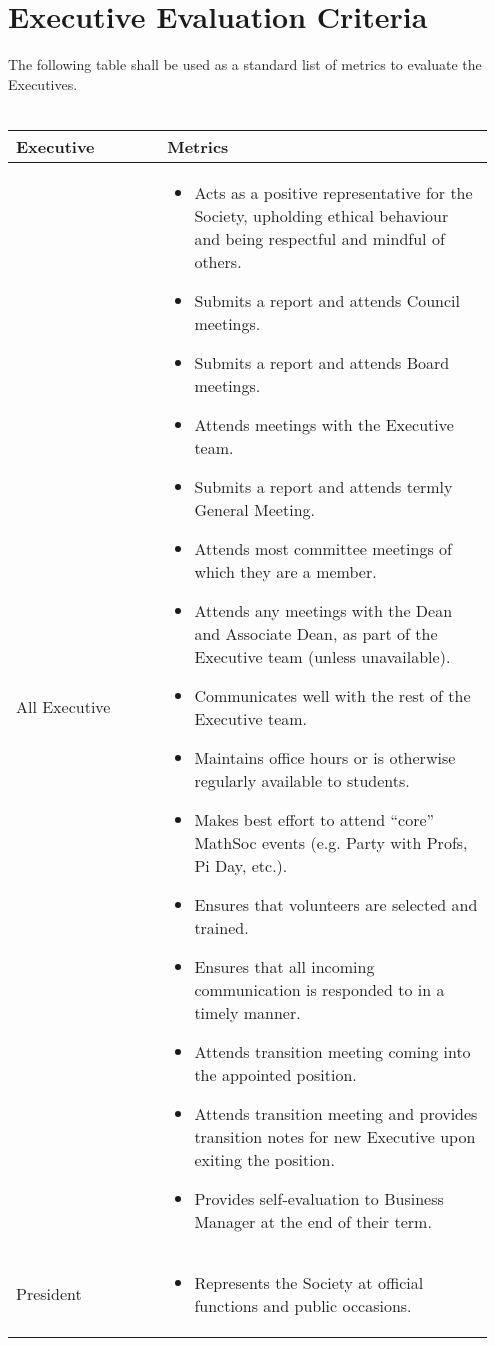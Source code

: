 \section{Executive Evaluation Criteria}

The following table shall be used as a standard list of metrics to evaluate the Executives.\\
\\
\begin{longtable}{p{0.3\linewidth} p{0.65\linewidth}}
\toprule
Executive & Metrics\\
\midrule
All Executive &
\begin{itemize}
\item Acts as a positive representative for the Society, upholding ethical behaviour and being respectful and mindful of others.
\item Submits a report and attends Council meetings.
\item Submits a report and attends Board meetings.
\item Attends meetings with the Executive team.
\item Submits a report and attends termly General Meeting.
\item Attends most committee meetings of which they are a member.
\item Attends any meetings with the Dean and Associate Dean, as part of the Executive team (unless unavailable).
\item Communicates well with the rest of the Executive team.
\item Maintains office hours or is otherwise regularly available to students.
\item Makes best effort to attend “core” MathSoc events (e.g. Party with Profs, Pi Day, etc.).
\item Ensures that volunteers are selected and trained.
\item Ensures that all incoming communication is responded to in a timely manner.
\item Attends transition meeting coming into the appointed position.
\item Attends transition meeting and provides transition notes for new Executive upon exiting the position.
\item Provides self-evaluation to Business Manager at the end of their term.
\end{itemize}
\\
\midrule
President &
\begin{itemize}
\item Represents the Society at official functions and public occasions.

\end{itemize}
\end{longtable}
